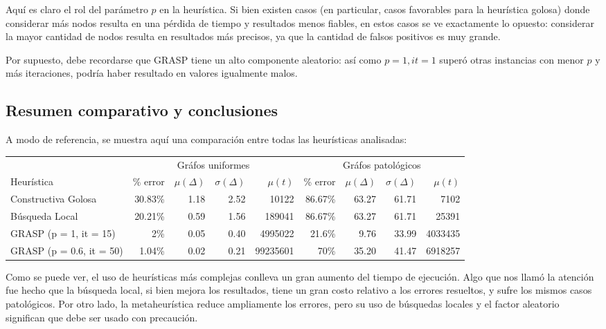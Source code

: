 Aquí es claro el rol del parámetro $p$ en la heurística. Si bien existen casos (en particular, casos favorables para la heurística golosa) donde considerar más nodos resulta en una pérdida de tiempo y resultados menos fiables, en estos casos se ve exactamente lo opuesto: considerar la mayor cantidad de nodos resulta en resultados más precisos, ya que la cantidad de falsos positivos es muy grande.

Por supuesto, debe recordarse que GRASP tiene un alto componente aleatorio: así como $p = 1, it = 1$ superó otras instancias con menor $p$ y más iteraciones, podría haber resultado en valores igualmente malos.

\subsection*{Resumen comparativo y conclusiones}

A modo de referencia, se muestra aquí una comparación entre todas las heurísticas analisadas:

\bigskip

\begin{tabular}{| l | r | r | r | r | r | r | r | r |}
    \hline
                             & \multicolumn{4}{|c|}{Gráfos uniformes}                            & \multicolumn{4}{|c|}{Gráfos patológicos}    \\ \cline{2-9}
    Heurística               & \% error & $\mu(\Delta)$ & $\sigma(\Delta)$ & $\mu(t)$ & \% error & $\mu(\Delta)$ & $\sigma(\Delta)$ & $\mu(t)$ \\ \hline
    Constructiva Golosa      &  30.83\% &          1.18 &             2.52 &    10122 &  86.67\% &         63.27 &            61.71 &     7102 \\ \hline
    Búsqueda Local           &  20.21\% &          0.59 &             1.56 &   189041 &  86.67\% &         63.27 &            61.71 &    25391 \\ \hline
    GRASP (p = 1, it = 15)   &      2\% &          0.05 &             0.40 &  4995022 &   21.6\% &          9.76 &            33.99 &  4033435 \\ \hline
    GRASP (p = 0.6, it = 50) &   1.04\% &          0.02 &             0.21 & 99235601 &     70\% &         35.20 &            41.47 &  6918257 \\
    \hline
\end{tabular}

Como se puede ver, el uso de heurísticas más complejas conlleva un gran aumento del tiempo de ejecución. Algo que nos llamó la atención fue hecho que la búsqueda local, si bien mejora los resultados, tiene un gran costo relativo a los errores resueltos, y sufre los mismos casos patológicos. Por otro lado, la metaheurística reduce ampliamente los errores, pero su uso de búsquedas locales y el factor aleatorio significan que debe ser usado con precaución.

